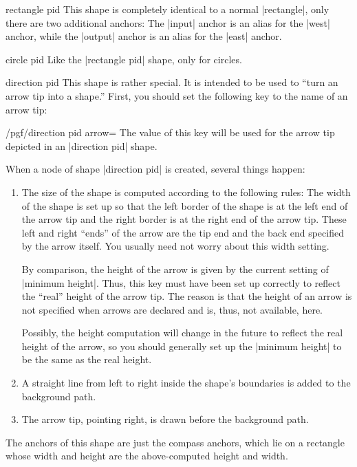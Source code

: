 \documentclass[a4paper]{ltxdoc}
\begin{document}
\begin{shape}{rectangle pid}
	This shape is completely identical to a normal |rectangle|, only
	there are two additional anchors: The |input| anchor is an alias for
	the |west| anchor, while the |output| anchor is an alias for the
	|east| anchor.
\end{shape}

\begin{shape}{circle pid}
	Like the |rectangle pid| shape, only for circles.
\end{shape}

\begin{shape}{direction pid}
	This shape is rather special. It is intended to be used to ``turn an
	arrow tip into a shape.'' First, you should set the following key to
	the name of an arrow tip:
	\begin{key}{/pgf/direction pid arrow=}
		The value of this key will be used for the arrow tip depicted in
		an |direction pid| shape.
	\end{key}
	When a node of shape |direction pid| is created, several things
	happen:
	\begin{enumerate}
		\item The size of the shape is computed according to the following
		      rules: The width of the shape is set up so that the left border of
		      the shape is at the left end of the arrow tip and the right border
		      is at the right end of the arrow tip. These left and right
		      ``ends'' of the arrow are the tip end and the back end specified
		      by the arrow itself. You usually need not worry about this width
		      setting.

		      By comparison, the height of the arrow is given by the current
		      setting of |minimum height|. Thus, this key must have been set up
		      correctly to reflect the ``real'' height of the arrow tip. The
		      reason is that the height of an arrow is not specified when arrows
		      are declared and is, thus, not available, here.

		      Possibly, the height computation will change in the future to
		      reflect the real height of the arrow, so you should generally
		      set up the |minimum height| to be the same as the real height.
		\item A straight line from left to right inside the shape's
		      boundaries is added to the background path.
		\item The arrow tip, pointing right, is drawn before the background
		      path.
	\end{enumerate}
	The anchors of this shape are just the compass anchors, which lie on
	a rectangle whose width and height are the above-computed height and
	width.


\end{shape}
\end{document}
